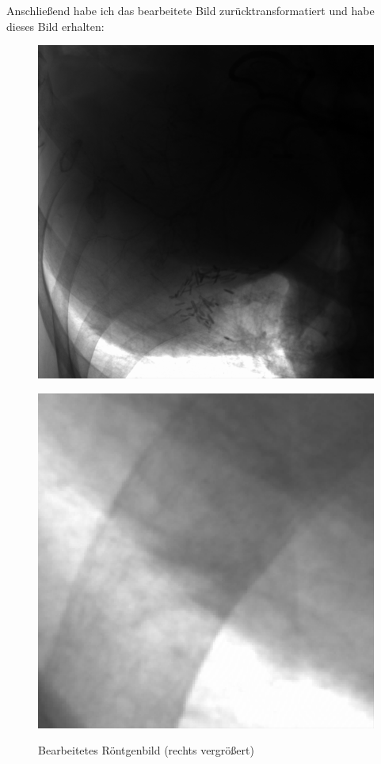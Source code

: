 \documentclass[a4paper,12pt]{article}
\theoremstyle{definition}
\theoremstyle{remark}
\begin{document}
Anschließend habe ich das bearbeitete Bild zurücktransformatiert und habe dieses Bild erhalten:

\begin{figure}[H]
  \centering
  \begin{minipage}{0.49\textwidth}
    \centering
    \includegraphics[width=\linewidth]{Bilder/edited.png}
    \label{fig:bild1}
  \end{minipage}
  \hfill
  \begin{minipage}{0.49\textwidth}
    \centering
    \includegraphics[width=\linewidth]{Bilder/edited_zoomed.png}
    \label{fig:bild2}
  \end{minipage}
  \caption{Bearbeitetes Röntgenbild (rechts vergrößert)}
\end{figure}
        
\end{document}
